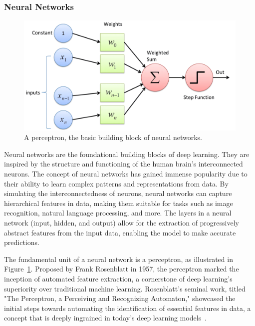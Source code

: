 \subsubsection*{Neural Networks}

\begin{figure}[htbp]
    \centering
    \includegraphics[width=\textwidth]{figures/perceptron.png}
    \caption{A perceptron, the basic building block of neural networks.~\cite{sharma2017perceptron} }
    \label{fig:perceptron}
\end{figure}

Neural networks are the foundational building blocks of deep learning. They are inspired by the structure and functioning of the human brain's interconnected neurons. The concept of neural networks has gained immense popularity due to their ability to learn complex patterns and representations from data. By simulating the interconnectedness of neurons, neural networks can capture hierarchical features in data, making them suitable for tasks such as image recognition, natural language processing, and more. The layers in a neural network (input, hidden, and output) allow for the extraction of progressively abstract features from the input data, enabling the model to make accurate predictions.

The fundamental unit of a neural network is a perceptron, as illustrated in Figure~\ref{fig:perceptron}. Proposed by Frank Rosenblatt in 1957, the perceptron marked the inception of automated feature extraction, a cornerstone of deep learning's superiority over traditional machine learning. Rosenblatt's seminal work, titled "The Perceptron, a Perceiving and Recognizing Automaton," showcased the initial steps towards automating the identification of essential features in data, a concept that is deeply ingrained in today's deep learning models~\cite{rosenblatt1957perceptron}.

